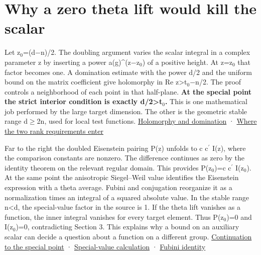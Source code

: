 \documentclass[11pt,letterpaper]{article}
\begin{document}
\section{Why a zero theta lift would kill the scalar}
Let z\ensuremath{{}_{0}}=(d\ensuremath{-}n)/2. The doubling argument varies the scalar integral in a complex parameter z by inserting a power a(g)\textasciicircum{}(z\ensuremath{-}z\ensuremath{{}_{0}}) of a positive height. At z=z\ensuremath{{}_{0}} that factor becomes one. A domination estimate with the power d/2 and the uniform bound on the matrix coefficient give holomorphy in Re z>t\ensuremath{{}_{0}}\ensuremath{-}n/2. The proof controls a neighborhood of each point in that half-plane. \textbf{At the special point the strict interior condition is exactly d/2>t\ensuremath{{}_{0}}.} This is one mathematical job performed by the large target dimension. The other is the geometric stable range d\ensuremath{\ge}2n, used for local test functions. \href{https://github.com/nousentllc/riemann-hypothesis/blob/40e56bab026552e089d7afcfeff08d2defb9c005/src/Development/AutomorphicArithmetic/Foundations/GaloisRepresentations/ThetaParseval/ThetaKernels/TPGRallis.lean\#L140-L185}{Holomorphy and domination} · \href{https://github.com/nousentllc/riemann-hypothesis/blob/40e56bab026552e089d7afcfeff08d2defb9c005/src/Development/AutomorphicArithmetic/Foundations/GaloisRepresentations/ThetaParseval/ThetaKernels/GalTPDefs.lean\#L141-L163}{Where the two rank requirements enter}

Far to the right the doubled Eisenstein pairing P(z) unfolds to c c\ensuremath{{}^{\prime}} I(z), where the comparison constants are nonzero. The difference continues as zero by the identity theorem on the relevant regular domain. This provides P(z\ensuremath{{}_{0}})=c c\ensuremath{{}^{\prime}} I(z\ensuremath{{}_{0}}). At the same point the anisotropic Siegel–Weil value identifies the Eisenstein expression with a theta average. Fubini and conjugation reorganize it as a normalization times an integral of a squared absolute value. In the stable range n<d, the special-value factor in the source is 1. If the theta lift vanishes as a function, the inner integral vanishes for every target element. Thus P(z\ensuremath{{}_{0}})=0 and I(z\ensuremath{{}_{0}})=0, contradicting Section 3. This explains why a bound on an auxiliary scalar can decide a question about a function on a different group. \href{https://github.com/nousentllc/riemann-hypothesis/blob/40e56bab026552e089d7afcfeff08d2defb9c005/src/Development/AutomorphicArithmetic/Foundations/GaloisRepresentations/ThetaParseval/ThetaKernels/TPGRallis.lean\#L186-L205}{Continuation to the special point} · \href{https://github.com/nousentllc/riemann-hypothesis/blob/40e56bab026552e089d7afcfeff08d2defb9c005/src/Development/AutomorphicArithmetic/Foundations/GaloisRepresentations/ThetaParseval/ThetaKernels/TPGRallis.lean\#L206-L225}{Special-value calculation} · \href{https://github.com/nousentllc/riemann-hypothesis/blob/40e56bab026552e089d7afcfeff08d2defb9c005/src/Development/WeilBound/ThetaLifts/LatticeBasics/FarRight.lean\#L34-L47}{Fubini identity}
\end{document}
